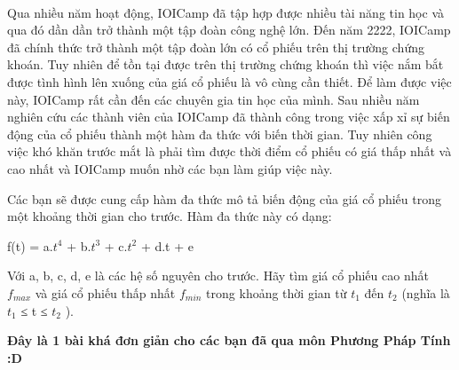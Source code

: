  

Qua nhiều năm hoạt động, IOICamp đã tập hợp được nhiều tài năng tin học và qua đó dần dần trở thành một tập đoàn công nghệ lớn. Đến năm 2222, IOICamp đã chính thức trở thành một tập đoàn lớn có cổ phiếu trên thị trường chứng khoán. Tuy nhiên để tồn tại được trên thị trường chứng khoán thì việc nắm bắt được tình hình lên xuống của giá cổ phiếu là vô cùng cần thiết. Để làm được việc này, IOICamp rất cần đến các chuyên gia tin học của mình. Sau nhiều năm nghiên cứu các thành viên của IOICamp đã thành công trong việc xấp xỉ sự biến động của cổ phiếu thành một hàm đa thức với biến thời gian. Tuy nhiên công việc khó khăn trước mắt là phải tìm được thời điểm cổ phiếu có giá thấp nhất và cao nhất và IOICamp muốn nhờ các bạn làm giúp việc này.

Các bạn sẽ được cung cấp hàm đa thức mô tả biến động của giá cổ phiếu trong một khoảng thời gian cho trước. Hàm đa thức này có dạng:

f(t) = a.$t^{4}$ + b.$t^{3}$ + c.$t^{2}$ + d.t + e

Với a, b, c, d, e là các hệ số nguyên cho trước. Hãy tìm giá cổ phiếu cao nhất $f_{max}$ và giá cổ phiếu thấp nhất $f_{min}$ trong khoảng thời gian từ $t_{1}$ đến $t_{2}$ (nghĩa là $t_{1}$ ≤ t ≤ $t_{2}$ ).

\textbf{Đ}\textbf{ây là 1 bài khá đơn giản cho các bạn đã qua môn Phương Pháp Tính :D }